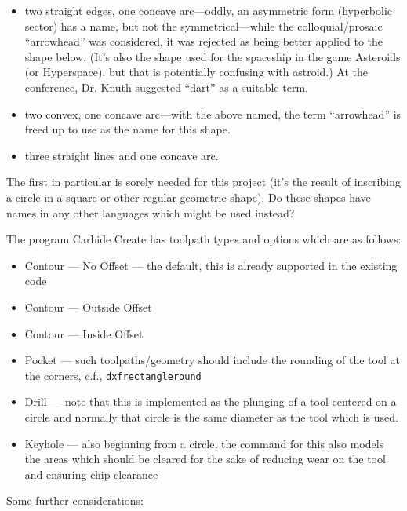 \documentclass{ltxdoc}
\begin{document}
\begin{itemize}
 \item two straight edges, one concave arc---oddly, an asymmetric form (hyperbolic sector) has a name, 
       but not the symmetrical---while the colloquial/prosaic “arrowhead” was considered, it was
       rejected as being better applied to the shape below. (It’s also the shape used for the
       spaceship in the game Asteroids (or Hyperspace), but that  is potentially confusing with
       astroid.) At the  conference, Dr. Knuth suggested “dart” as a suitable term.
 \item two convex, one concave arc---with the above named, the term “arrowhead” is freed up to use
       as the name for this shape.
 \item three straight lines and one concave arc.
 \end{itemize}

 The first in particular is sorely needed for this project (it’s the result of inscribing a circle in a square or other regular geometric shape). Do these shapes have names in any other languages which might be used instead?

The program Carbide Create has toolpath types and options which are as follows:

\begin{itemize}
 \item Contour --- No Offset --- the default, this is already supported in the existing code
 \item Contour --- Outside Offset
 \item Contour --- Inside Offset
 \item Pocket --- such toolpaths/geometry should include the rounding of the tool 
       at the corners, c.f., \verb|dxfrectangleround|
 \item Drill --- note that this is implemented as the plunging of a tool centered on a circle
                 and normally that circle is the same diameter as the tool which is used.
 \item Keyhole --- also beginning from a circle, the command for this also models the areas which
                   should be cleared for the sake of reducing wear
                   on the tool and ensuring chip clearance
\end{itemize}

 
Some further considerations:
\end{document}
